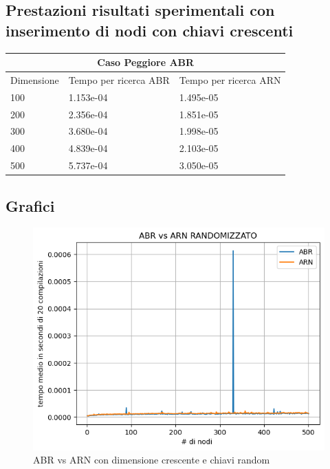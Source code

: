 \documentclass[12pt]{article}
\begin{document}
\subsection{Prestazioni risultati sperimentali con inserimento di nodi con chiavi crescenti}

\begin{center}
\begin{tabular}[]{ |p{3cm}||p{5cm}||p{5cm}| }
\hline
\multicolumn{3}{|c|}{Caso Peggiore ABR} \\
\hline
Dimensione & Tempo per ricerca ABR & Tempo per ricerca ARN \\
\hline
100  &  1.153e-04  &  1.495e-05\\
200  &  2.356e-04  &  1.851e-05\\
300  &  3.680e-04  &  1.998e-05\\
400  &  4.839e-04  &  2.103e-05\\
500  &  5.737e-04  &  3.050e-05\\
\hline
\end{tabular}
\end{center}


\subsection{Grafici}
\begin{figure}[H]
\includegraphics[width = 12cm]{ABR_vs_ARN_RANDOMIZZATO}
\centering
\caption{ABR vs ARN con dimensione crescente e chiavi random}
\label{fig:1}
\end{figure}  
\end{document}
